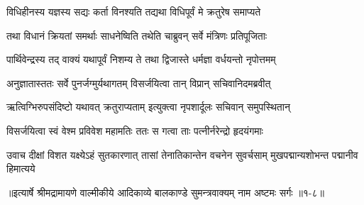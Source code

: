 \twolineshloka
{विधिहीनस्य यज्ञस्य सद्यः कर्ता विनश्यति}
{तद्यथा विधिपूर्वं मे क्रतुरेष समाप्यते} %

\twolineshloka
{तथा विधानं क्रियतां समर्थाः साधनेष्विति}
{तथेति चाब्रुवन् सर्वे मंत्रिणः प्रतिपूजिताः} %

\twolineshloka
{पार्थिवेन्द्रस्य तद् वाक्यं यथापूर्वं निशम्य ते}
{तथा द्विजास्ते धर्मज्ञा वर्धयन्तो नृपोत्तमम्} %

\twolineshloka
{अनुज्ञातास्ततः सर्वे पुनर्जग्मुर्यथागतम्}
{विसर्जयित्वा तान् विप्रान् सचिवानिदमब्रवीत्} %

\twolineshloka
{ऋत्विग्भिरुपसंदिष्टो यथावत् क्रतुराप्यताम्}
{इत्युक्त्वा नृपशार्दूलः सचिवान् समुपस्थितान्} %

\twolineshloka
{विसर्जयित्वा स्वं वेश्म प्रविवेश महामतिः}
{ततः स गत्वा ताः पत्नीर्नरेन्द्रो हृदयंगमाः} %

\threelineshloka
{उवाच दीक्षां विशत यक्ष्येऽहं सुतकारणात्}
{तासां तेनातिकान्तेन वचनेन सुवर्चसाम्}
{मुखपद्मान्यशोभन्त पद्मानीव हिमात्यये} %


॥इत्यार्षे श्रीमद्रामायणे वाल्मीकीये आदिकाव्ये बालकाण्डे सुमन्त्रवाक्यम् नाम अष्टमः सर्गः ॥१-८॥
